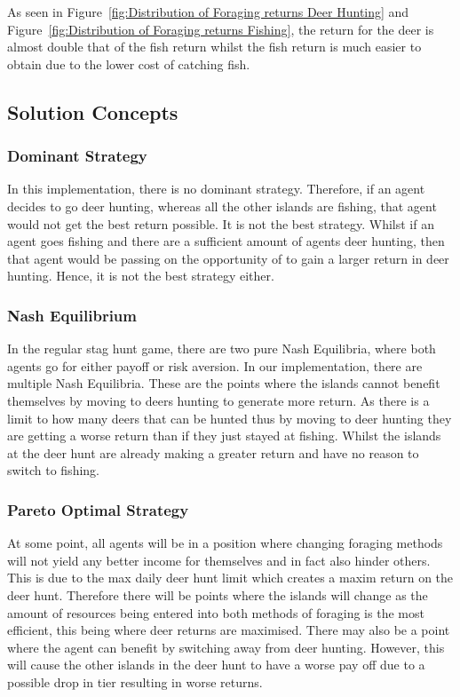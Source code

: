 As seen in Figure~\ref{fig:Distribution of Foraging returns Deer Hunting} and Figure~\ref{fig:Distribution of Foraging returns Fishing}, the return for the deer is almost double that of the fish return whilst the fish return is much easier to obtain due to the lower cost of catching fish.

\newpage
\subsection{Solution Concepts}
\subsubsection{Dominant Strategy}

In this implementation, there is no dominant strategy. Therefore, if an agent decides to go deer hunting, whereas all the other islands are fishing, that agent would not get the best return possible. It is not the best strategy. Whilst if an agent goes fishing and there are a sufficient amount of agents deer hunting, then that agent would be passing on the opportunity of to gain a larger return in deer hunting. Hence, it is not the best strategy either.

\subsubsection{Nash Equilibrium}

In the regular stag hunt game, there are two pure Nash Equilibria, where both agents go for either payoff or risk aversion. In our implementation, there are multiple Nash Equilibria. These are the points where the islands cannot benefit themselves by moving to deers hunting to generate more return. As there is a limit to how many deers that can be hunted thus by moving to deer hunting they are getting a worse return than if they just stayed at fishing. Whilst the islands at the deer hunt are already making a greater return and have no reason to switch to fishing.

\subsubsection{Pareto Optimal Strategy}

At some point, all agents will be in a position where changing foraging methods will not yield any better income for themselves and in fact also hinder others. This is due to the max daily deer hunt limit which creates a maxim return on the deer hunt. Therefore there will be points where the islands will change as the amount of resources being entered into both methods of foraging is the most efficient, this being where deer returns are maximised. There may also be a point where the agent can benefit by switching away from deer hunting. However, this will cause the other islands in the deer hunt to have a worse pay off due to a possible drop in tier resulting in worse returns.

